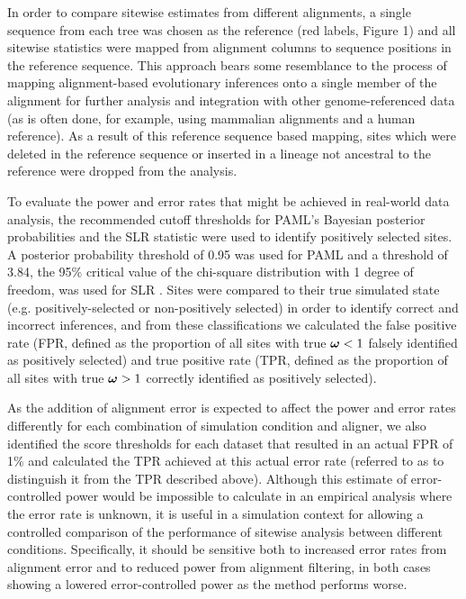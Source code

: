 \documentclass{mbe}
\begin{document}
In order to compare sitewise estimates from different alignments, a
single sequence from each tree was chosen as the reference (red
labels, Figure 1) and all sitewise statistics were mapped from
alignment columns to sequence positions in the reference
sequence. This approach bears some resemblance to the process of
mapping alignment-based evolutionary inferences onto a single member
of the alignment for further analysis and integration with other
genome-referenced data (as is often done, for example, using mammalian
alignments and a human reference). As a result of this reference
sequence based mapping, sites which were deleted in the reference
sequence or inserted in a lineage not ancestral to the reference were
dropped from the analysis.

To evaluate the power and error rates that might be achieved in
real-world data analysis, the recommended cutoff thresholds for PAML’s
Bayesian posterior probabilities and the SLR statistic were used to
identify positively selected sites. A posterior probability threshold
of 0.95 was used for PAML \citep{Yang2005Bayes} and a threshold of 3.84,
the 95\% critical value of the chi-square distribution with 1 degree
of freedom, was used for SLR \citep{Massingham2005Detecting}. Sites were
compared to their true simulated state (e.g. positively-selected or
non-positively selected) in order to identify correct and incorrect
inferences, and from these classifications we calculated the false
positive rate (FPR, defined as the proportion of all sites with true
$\bm{\omega}{}<1$ falsely identified as positively selected) and true positive rate
(TPR, defined as the proportion of all sites with true $\bm{\omega}{}>1$ correctly
identified as positively selected).

As the addition of alignment error is expected to affect the power and
error rates differently for each combination of simulation condition
and aligner, we also identified the score thresholds for each dataset
that resulted in an actual FPR of 1\% and calculated the TPR achieved
at this actual error rate (referred to as \tpr{} to distinguish it
from the TPR described above). Although this estimate of
error-controlled power would be impossible to calculate in an
empirical analysis where the error rate is unknown, it is useful in a
simulation context for allowing a controlled comparison of the
performance of sitewise analysis between different
conditions. Specifically, it should be sensitive both to increased
error rates from alignment error and to reduced power from alignment
filtering, in both cases showing a lowered error-controlled power as
the method performs worse.
\end{document}
